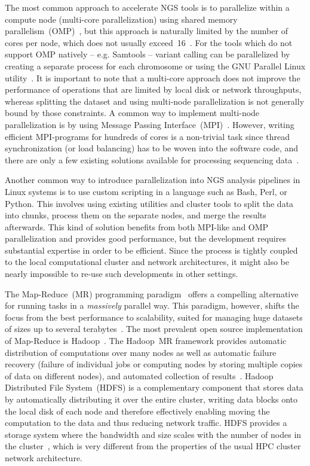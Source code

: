 \documentclass[10pt]{article}
\begin{document}
The most common approach to accelerate NGS tools is to parallelize within a compute node (multi-core parallelization) using shared memory parallelism~(OMP)~\cite{openmp}, but this approach is naturally limited by the number of cores per node, which does not usually exceed~16~\cite{top500}. For the tools which do not support OMP natively -- e.g. Samtools -- variant calling can be parallelized by creating a separate process for each chromosome or using the GNU Parallel Linux utility~\cite{Tange2011a}.
It is important to note that a multi-core approach does not improve the performance of operations that are limited by local disk or network throughputs, whereas splitting the dataset and using multi-node parallelization is not generally bound by those constraints. A common way to implement multi-node parallelization is by using Message Passing Interface~(MPI)~\cite{mpi1}. However, writing efficient MPI-programs for hundreds of cores is a non-trivial task since thread synchronization (or load balancing) has to be woven into the software code, and there are only a few existing solutions available for processing sequencing data~\cite{pmap, erne, gnumap}.

Another common way to introduce parallelization into NGS analysis pipelines in Linux systems is to use custom scripting in a language such as Bash, Perl, or Python. This involves using existing utilities and cluster tools to split the data into chunks, process them on the separate nodes, and merge the results afterwards. This kind of solution benefits from both MPI-like and OMP parallelization and provides good performance, but the development requires substantial expertise in order to be efficient. Since the process is tightly coupled to the local computational cluster and network architectures, it might also be nearly impossible to re-use such developments in other settings.

The Map-Reduce~(MR) programming paradigm~\cite{dean.2004.mapreduce} offers a compelling alternative for running tasks in a {\it massively} parallel way. This paradigm, however, shifts the focus from the best performance to scalability, suited for managing huge datasets of sizes up to several terabytes~\cite{lin2010}.
The most prevalent open source implementation of Map-Reduce is Hadoop~\cite{hadoop,Hadoop:Guide}.
The Hadoop~MR framework provides automatic distribution of computations over many nodes as well as automatic failure recovery (failure of individual jobs or computing nodes by storing multiple copies of data on different nodes), and automated collection of results~\cite{Hadoop:Guide}. Hadoop Distributed File System~(HDFS) is a complementary component that stores data by automatically distributing it over the entire cluster, writing data blocks onto the local disk of each node and therefore effectively enabling moving the computation to the data and thus reducing network traffic. HDFS provides a storage system where the bandwidth and size scales with the number of nodes in the cluster~\cite{Sammer:2012}, which is very different from the properties of the usual HPC cluster network architecture.
\end{document}
